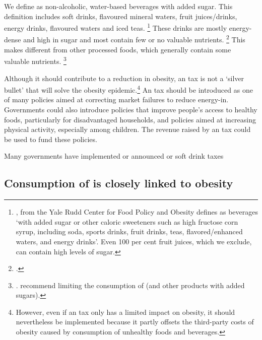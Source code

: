 \documentclass[embargoed]{grattan}
\begin{document}
We define \SSBs{} as non-alcoholic, water-based beverages with added sugar. This definition includes soft drinks, flavoured mineral waters, fruit juices/drinks, energy drinks, flavoured waters and iced teas.%
\footnote{\textcite{Friedman2012Sugarsweetenedbeverage}, from the Yale Rudd Center for Food Policy and Obesity defines \SSBs{} as beverages `with added sugar or other caloric sweeteners such as high fructose corn syrup, including soda, sports drinks, fruit drinks, teas, flavored/enhanced waters, and energy drinks'.
Even 100 per cent fruit juices, which we exclude, can contain high levels of sugar.} These drinks are mostly energy-dense and high in sugar and most contain few or no valuable nutrients.%
\footcites{Kaplin2013Usingeconomicpolicy}{Mozaffarian2016politicssciencesoda} This makes \SSBs{} different from other processed foods, which generally contain some valuable nutrients.%
\footnote{\textcite{LordanShouldweput}.
\textcite[][Guideline~3]{Health2013AustralianDietaryGuidelines} recommend limiting the consumption of \SSBs{} (and other products with added sugars).}

Although it should contribute to a reduction in obesity, an \SSB{} tax is not a `silver bullet' that will solve the obesity epidemic.\footnote{However, even if an \SSB{} tax only has a limited impact on obesity, it should nevertheless be implemented because it partly offsets the third-party costs of obesity caused by consumption of unhealthy foods and beverages.} An \SSB{} tax should be introduced as one of many policies aimed at correcting market failures to reduce energy-in.
Governments could also introduce policies that improve people's access to healthy foods, particularly for disadvantaged households, and policies aimed at increasing physical activity, especially among children.
The revenue raised by an \SSB{} tax could be used to fund these policies.


\begin{table}
\caption{Many governments have implemented or announced \SSB{} or soft drink taxes}\label{tbl:SSB-taxes-by-country}




\end{table}

\subsection{Consumption of \SSBs{} is closely linked to obesity}\label{subsec:consumption-of-ssbs-is-closely-linked-to-obesity}
\end{document}

